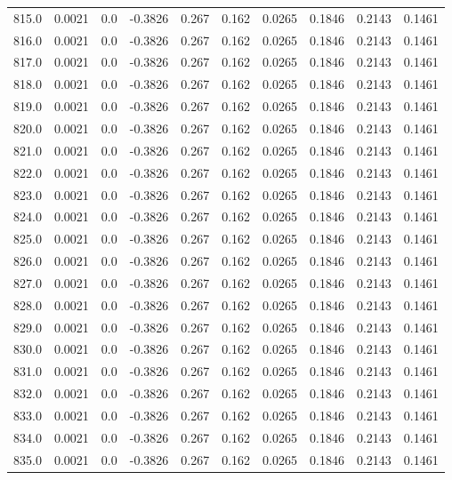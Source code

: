 \begin{longtable}{lrrrrrrrrr}
815.0 & 0.0021 & 0.0 & -0.3826 & 0.267 & 0.162 & 0.0265 & 0.1846 & 0.2143 & 0.1461 \\
816.0 & 0.0021 & 0.0 & -0.3826 & 0.267 & 0.162 & 0.0265 & 0.1846 & 0.2143 & 0.1461 \\
817.0 & 0.0021 & 0.0 & -0.3826 & 0.267 & 0.162 & 0.0265 & 0.1846 & 0.2143 & 0.1461 \\
818.0 & 0.0021 & 0.0 & -0.3826 & 0.267 & 0.162 & 0.0265 & 0.1846 & 0.2143 & 0.1461 \\
819.0 & 0.0021 & 0.0 & -0.3826 & 0.267 & 0.162 & 0.0265 & 0.1846 & 0.2143 & 0.1461 \\
820.0 & 0.0021 & 0.0 & -0.3826 & 0.267 & 0.162 & 0.0265 & 0.1846 & 0.2143 & 0.1461 \\
821.0 & 0.0021 & 0.0 & -0.3826 & 0.267 & 0.162 & 0.0265 & 0.1846 & 0.2143 & 0.1461 \\
822.0 & 0.0021 & 0.0 & -0.3826 & 0.267 & 0.162 & 0.0265 & 0.1846 & 0.2143 & 0.1461 \\
823.0 & 0.0021 & 0.0 & -0.3826 & 0.267 & 0.162 & 0.0265 & 0.1846 & 0.2143 & 0.1461 \\
824.0 & 0.0021 & 0.0 & -0.3826 & 0.267 & 0.162 & 0.0265 & 0.1846 & 0.2143 & 0.1461 \\
825.0 & 0.0021 & 0.0 & -0.3826 & 0.267 & 0.162 & 0.0265 & 0.1846 & 0.2143 & 0.1461 \\
826.0 & 0.0021 & 0.0 & -0.3826 & 0.267 & 0.162 & 0.0265 & 0.1846 & 0.2143 & 0.1461 \\
827.0 & 0.0021 & 0.0 & -0.3826 & 0.267 & 0.162 & 0.0265 & 0.1846 & 0.2143 & 0.1461 \\
828.0 & 0.0021 & 0.0 & -0.3826 & 0.267 & 0.162 & 0.0265 & 0.1846 & 0.2143 & 0.1461 \\
829.0 & 0.0021 & 0.0 & -0.3826 & 0.267 & 0.162 & 0.0265 & 0.1846 & 0.2143 & 0.1461 \\
830.0 & 0.0021 & 0.0 & -0.3826 & 0.267 & 0.162 & 0.0265 & 0.1846 & 0.2143 & 0.1461 \\
831.0 & 0.0021 & 0.0 & -0.3826 & 0.267 & 0.162 & 0.0265 & 0.1846 & 0.2143 & 0.1461 \\
832.0 & 0.0021 & 0.0 & -0.3826 & 0.267 & 0.162 & 0.0265 & 0.1846 & 0.2143 & 0.1461 \\
833.0 & 0.0021 & 0.0 & -0.3826 & 0.267 & 0.162 & 0.0265 & 0.1846 & 0.2143 & 0.1461 \\
834.0 & 0.0021 & 0.0 & -0.3826 & 0.267 & 0.162 & 0.0265 & 0.1846 & 0.2143 & 0.1461 \\
835.0 & 0.0021 & 0.0 & -0.3826 & 0.267 & 0.162 & 0.0265 & 0.1846 & 0.2143 & 0.1461 \\

\end{longtable}
